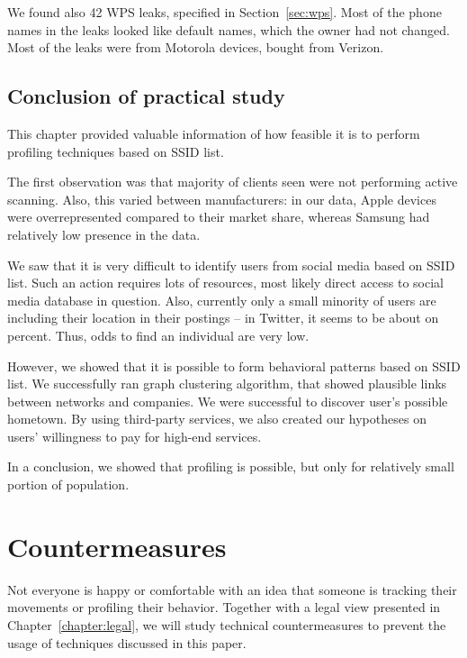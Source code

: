 \documentclass[12pt,a4paper,oneside,pdftex]{report}
\begin{document}
We found also 42 WPS leaks, specified in Section~\ref{sec:wps}. Most of the phone names in the leaks looked like default names, which the owner had not changed. Most of the leaks were from Motorola devices, bought from Verizon.


\section{Conclusion of practical study}
\label{sec:practical_conclusion}

This chapter provided valuable information of how feasible it is to perform profiling techniques based on SSID list.

The first observation was that majority of clients seen were not performing active scanning. Also, this varied between manufacturers: in our data, Apple devices were overrepresented compared to their market share, whereas Samsung had relatively low presence in the data.

We saw that it is very difficult to identify users from social media based on SSID list. Such an action requires lots of resources, most likely direct access to social media database in question. Also, currently only a small minority of users are including their location in their postings -- in Twitter, it seems to be about on percent. Thus, odds to find an individual are very low.

However, we showed that it is possible to form behavioral patterns based on SSID list. We successfully ran graph clustering algorithm, that showed plausible links between networks and companies. We were successful to discover user's possible hometown. By using third-party services, we also created our hypotheses on users' willingness to pay for high-end services.

In a conclusion, we showed that profiling is possible, but only for relatively small portion of population.



\chapter{Countermeasures}
\label{chapter:countermeasures}

Not everyone is happy or comfortable with an idea that someone is tracking their movements or profiling their behavior. Together with a legal view presented in Chapter~\ref{chapter:legal}, we will study technical countermeasures to prevent the usage of techniques discussed in this paper. 
\end{document}
